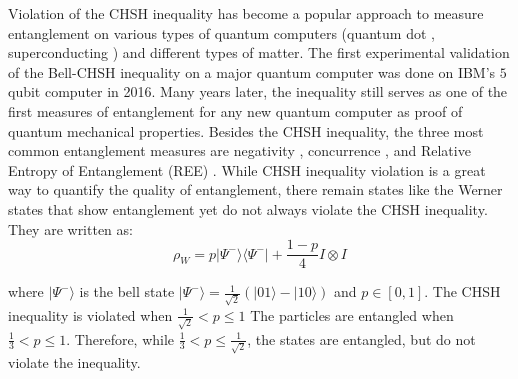 \documentclass[a4paper, onecolumn, 11pt, titlepage]{quantumarticle}
\begin{document}



Violation of the CHSH inequality has become a popular approach to measure entanglement on various types of quantum computers (quantum dot \cite{steinacker2025bell}, superconducting \cite{storz2023loophole}) and different types of matter. The first experimental validation of the Bell-CHSH inequality on a major quantum computer was done on IBM’s $5$ qubit computer in 2016. Many years later, the inequality still serves as one of the first measures of entanglement for any new quantum computer as proof of quantum mechanical properties. Besides the CHSH inequality, the three most common entanglement measures are negativity \cite{PhysRevA.65.032314}, concurrence \cite{PhysRevLett.80.2245}, and Relative Entropy of Entanglement (REE) \cite{PhysRevLett.78.2275}. While CHSH inequality violation is a great way to quantify the quality of entanglement, there remain states like the Werner states that show entanglement yet do not always violate the CHSH inequality. They are written as:
$$\rho_W = p|\Psi^-\rangle \langle\Psi^-| + \frac{1 - p}{4}I \otimes I$$

where $|\Psi^-\rangle$ is the bell state $|\Psi^-\rangle = \frac{1}{\sqrt{2}} (|01\rangle - |10\rangle)$ and $p \in [0,1]$. 
 The CHSH inequality is violated when 
$\frac{1}{\sqrt{2}} < p \leq 1$
The particles are entangled when 
$\frac{1}{3} < p \leq 1$.
Therefore, while $\frac{1}{3} < p \leq \frac{1}{\sqrt{2}}$, the states are entangled, but do not violate the inequality. 
\end{document}

